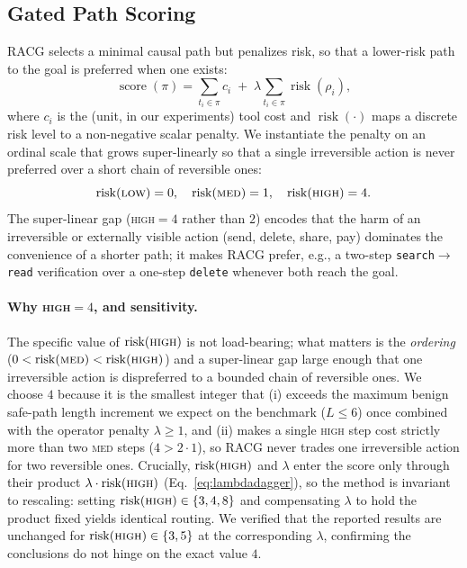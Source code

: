 \documentclass[conference,onecolumn]{IEEEtran}
\begin{document}
\subsection{Gated Path Scoring}
RACG selects a minimal causal path but penalizes risk, so that a lower-risk path to the goal is preferred when one exists:
\begin{equation}
\operatorname{score}(\pi) = \sum_{t_i\in\pi} c_i \;+\; \lambda \sum_{t_i\in\pi}\operatorname{risk}(\rho_i),
\label{eq:score}
\end{equation}
where $c_i$ is the (unit, in our experiments) tool cost and $\operatorname{risk}(\cdot)$ maps a discrete risk level to a non-negative scalar penalty. We instantiate the penalty on an ordinal scale that grows super-linearly so that a single irreversible action is never preferred over a short chain of reversible ones:
\begin{equation}
\operatorname{risk}(\textsc{low})=0,\quad
\operatorname{risk}(\textsc{med})=1,\quad
\operatorname{risk}(\textsc{high})=4.
\label{eq:riskmap}
\end{equation}
The super-linear gap (\textsc{high}$=4$ rather than $2$) encodes that the harm of an irreversible or externally visible action (send, delete, share, pay) dominates the convenience of a shorter path; it makes RACG prefer, e.g., a two-step \texttt{search}$\rightarrow$\texttt{read} verification over a one-step \texttt{delete} whenever both reach the goal.

\paragraph{Why \textsc{high}$=4$, and sensitivity.} The specific value of $\operatorname{risk}(\textsc{high})$ is not load-bearing; what matters is the \emph{ordering} ($0 < \operatorname{risk}(\textsc{med}) < \operatorname{risk}(\textsc{high})$) and a super-linear gap large enough that one irreversible action is dispreferred to a bounded chain of reversible ones. We choose $4$ because it is the smallest integer that (i) exceeds the maximum benign safe-path length increment we expect on the benchmark ($L \le 6$) once combined with the operator penalty $\lambda \ge 1$, and (ii) makes a single \textsc{high} step cost strictly more than two \textsc{med} steps ($4 > 2\cdot1$), so RACG never trades one irreversible action for two reversible ones. Crucially, $\operatorname{risk}(\textsc{high})$ and $\lambda$ enter the score only through their product $\lambda\cdot\operatorname{risk}(\textsc{high})$ (Eq.~\eqref{eq:lambdadagger}), so the method is invariant to rescaling: setting $\operatorname{risk}(\textsc{high})\in\{3,4,8\}$ and compensating $\lambda$ to hold the product fixed yields identical routing. We verified that the reported results are unchanged for $\operatorname{risk}(\textsc{high})\in\{3,5\}$ at the corresponding $\lambda$, confirming the conclusions do not hinge on the exact value $4$.
\end{document}
